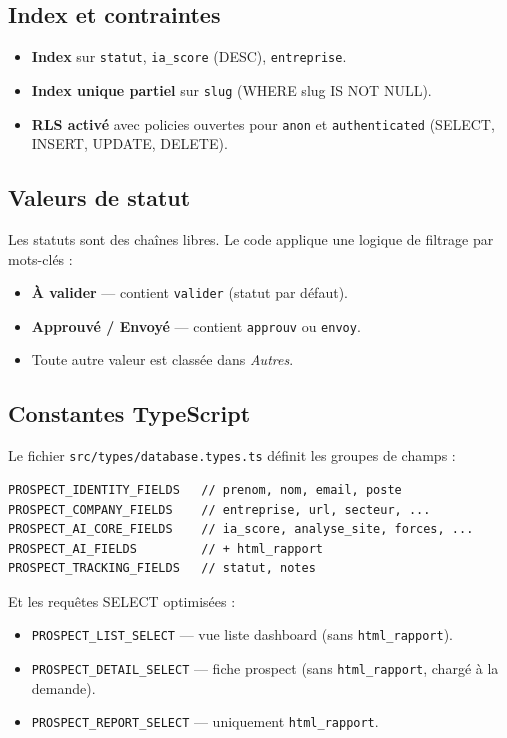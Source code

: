 \documentclass[11pt,a4paper]{report}
\begin{document}
\subsection{Index et contraintes}

\begin{itemize}[leftmargin=*]
  \item \textbf{Index} sur \texttt{statut}, \texttt{ia\_score} (DESC), \texttt{entreprise}.
  \item \textbf{Index unique partiel} sur \texttt{slug} (WHERE slug IS NOT NULL).
  \item \textbf{RLS activé} avec policies ouvertes pour \texttt{anon} et \texttt{authenticated} (SELECT, INSERT, UPDATE, DELETE).
\end{itemize}

\subsection{Valeurs de statut}

Les statuts sont des chaînes libres. Le code applique une logique de filtrage par mots-clés :

\begin{itemize}[leftmargin=*]
  \item \textbf{À valider} --- contient \texttt{valider} (statut par défaut).
  \item \textbf{Approuvé / Envoyé} --- contient \texttt{approuv} ou \texttt{envoy}.
  \item Toute autre valeur est classée dans \emph{Autres}.
\end{itemize}

\subsection{Constantes TypeScript}

Le fichier \texttt{src/types/database.types.ts} définit les groupes de champs :

\begin{lstlisting}
PROSPECT_IDENTITY_FIELDS   // prenom, nom, email, poste
PROSPECT_COMPANY_FIELDS    // entreprise, url, secteur, ...
PROSPECT_AI_CORE_FIELDS    // ia_score, analyse_site, forces, ...
PROSPECT_AI_FIELDS         // + html_rapport
PROSPECT_TRACKING_FIELDS   // statut, notes
\end{lstlisting}

Et les requêtes SELECT optimisées :
\begin{itemize}[leftmargin=*]
  \item \texttt{PROSPECT\_LIST\_SELECT} --- vue liste dashboard (sans \texttt{html\_rapport}).
  \item \texttt{PROSPECT\_DETAIL\_SELECT} --- fiche prospect (sans \texttt{html\_rapport}, chargé à la demande).
  \item \texttt{PROSPECT\_REPORT\_SELECT} --- uniquement \texttt{html\_rapport}.
\end{itemize}
\end{document}

